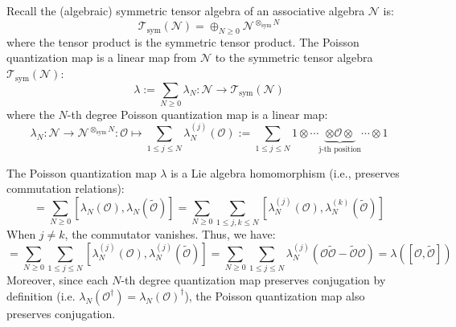 \documentclass[a4paper,11pt]{article}
\theoremstyle{definition}
\numberwithin{equation}{section}
\begin{document}
Recall the (algebraic) symmetric tensor algebra of an associative algebra $\mathcal{N}$ is:
\begin{equation*}
    \mathcal{T}_\text{sym}(\mathcal{N}) = \oplus_{N\geq 0}\mathcal{N}^{\otimes_\text{sym} N}
\end{equation*}
where the tensor product is the symmetric tensor product. The Poisson quantization map is a linear map from $\mathcal{N}$ to the symmetric tensor algebra $\mathcal{T}_\text{sym}(\mathcal{N})$:
\begin{equation}
    \lambda:=\sum_{N\geq 0}\lambda_N:\mathcal{N}\rightarrow \mathcal{T}_\text{sym}(\mathcal{N})
\end{equation}
where the $N$-th degree Poisson quantization map is a linear map:
\begin{equation}
    \lambda_N:\mathcal{N}\rightarrow\mathcal{N}^{\otimes_\text{sym} N}: \mathcal{O}\mapsto \sum_{1\leq j\leq N}\lambda_N^{(j)}(\mathcal{O}):=\sum_{1\leq j\leq N}1\otimes\cdots\underbrace{\otimes \mathcal{O}\otimes}_\text{j-th position}\cdots\otimes 1
\end{equation}


The Poisson quantization map $\lambda$ is a Lie algebra homomorphism (i.e., preserves commutation relations):
\begin{equation}
    [\lambda(\mathcal{O}), \lambda(\widetilde{\mathcal{O}})] = \sum_{N\geq 0}[\lambda_N(\mathcal{O}), \lambda_N(\widetilde{\mathcal{O}})] = \sum_{N\geq 0}\sum_{1\leq j, k\leq N}[\lambda_N^{(j)}(\mathcal{O}), \lambda_N^{(k)}(\widetilde{\mathcal{O}})]
\end{equation}
When $j \neq k$, the commutator vanishes. Thus, we have:
\begin{equation}
    [\lambda(\mathcal{O}), \lambda(\widetilde{\mathcal{O}})] = \sum_{N\geq 0}\sum_{1\leq j\leq N}[\lambda_N^{(j)}(\mathcal{O}), \lambda_N^{(j)}(\widetilde{\mathcal{O}})] = \sum_{N\geq 0}\sum_{1\leq j\leq N}\lambda_N^{(j)}(\mathcal{O}\widetilde{\mathcal{O}} - \widetilde{\mathcal{O}}\mathcal{O}) = \lambda([\mathcal{O},\widetilde{\mathcal{O}}])
\end{equation}
Moreover, since each $N$-th degree quantization map preserves conjugation by definition (i.e. $\lambda_N(\mathcal{O}^\dagger) = \lambda_N(\mathcal{O})^\dagger$), the Poisson quantization map also preserves conjugation.
\end{document}
